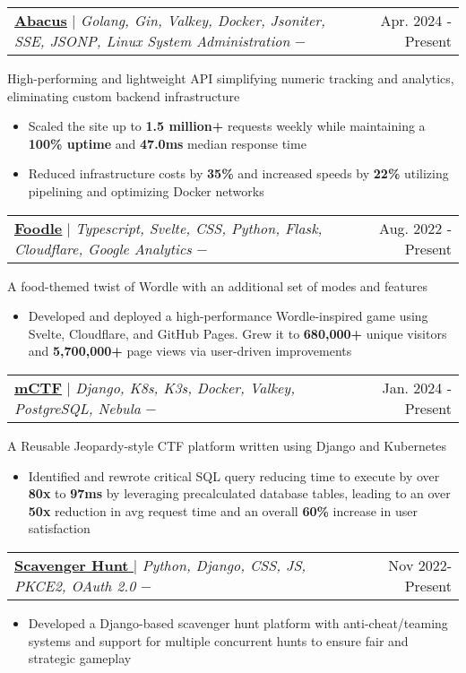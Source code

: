 \documentclass[11pt,letterpaper]{article}
\makeatletter
\newcommand{\resumeItem}[1]{
    \item\small{
            {#1 \vspace{-2pt}}
    }
}
\newcommand{\resumeProjectHeadingWithDescription}[4]{
    \item
    \begin{tabular*}{0.97\textwidth}{l@{\extracolsep{\fill}}r}
        \small#2 $-$ \githubUrl{#1} & #3 \\
    \end{tabular*}
    \vspace{-7pt}
    \small{#4}
}
\newcommand{\resumeItemListStart}{\begin{itemize}}
\newcommand{\resumeItemListEnd}{\end{itemize}\vspace{-5pt}}
\newcommand{\githubUrl}[1]{%
   \href{#1}{\faGithub}%
}
\makeatother
\begin{document}
\resumeProjectHeadingWithDescription
{https://github.com/JasonLovesDoggo/abacus}
{\underline{\textbf{\href{https://abacus.jasoncameron.dev}{Abacus}}} $|$ \emph{Golang, Gin, Valkey, Docker, Jsoniter, SSE, JSONP, Linux System Administration }}{Apr. 2024 - Present}
{High-performing and lightweight API simplifying numeric tracking and analytics, eliminating custom backend infrastructure}
\resumeItemListStart
\resumeItem{Scaled the site up to \textbf{1.5 million+} requests weekly while maintaining a \textbf{100\% uptime} and \textbf{47.0ms} median response time}
\resumeItem{Reduced infrastructure costs by \textbf{35\%} and increased speeds by \textbf{22\%} utilizing pipelining and optimizing Docker networks}
\resumeItemListEnd

\resumeProjectHeadingWithDescription
{https://github.com/JasonLovesDoggo/foodle}
{\underline{\href{https://jasoncameron.dev/foodle}{\textbf{Foodle}}} $|$ \emph{Typescript, Svelte, CSS, Python, Flask, Cloudflare, Google Analytics}} {Aug. 2022 - Present}
{A food-themed twist of Wordle with an additional set of modes and features}
\resumeItemListStart
\resumeItem{Developed and deployed a high-performance Wordle-inspired game using Svelte, Cloudflare, and GitHub Pages. Grew it to \textbf{680,000+} unique visitors and \textbf{5,700,000+} page views via user-driven improvements}
\resumeItemListEnd

\resumeProjectHeadingWithDescription
{https://github.com/mcpt/ctf}
{\underline{\textbf{\href{https://ctf.mcpt.ca}{mCTF}}} $|$ \emph{Django, K8s, K3s, Docker, Valkey, PostgreSQL, Nebula}}{Jan. 2024 - Present}
{A Reusable Jeopardy-style CTF platform written using Django and Kubernetes}
\resumeItemListStart
\resumeItem{Identified and rewrote critical SQL query reducing time to execute by over \textbf{80x} to \textbf{97ms} by leveraging precalculated database tables, leading to an over \textbf{50x} reduction in avg request time and an overall \textbf{60\%} increase in user satisfaction}
\resumeItemListEnd

\resumeProjectHeadingWithDescription
{https://github.com/wlmac/scavenger}
{\underline{\href{https://github.com/wlmac/scavenger}{\textbf{Scavenger Hunt }}} $|$  \emph{Python, Django, CSS, JS, PKCE2, OAuth 2.0}}{Nov 2022-Present}{}
\resumeItemListStart
\resumeItem{Developed a Django-based scavenger hunt platform with anti-cheat/teaming systems and support for multiple concurrent hunts to ensure fair and strategic gameplay}
\resumeItemListEnd
\end{document}
